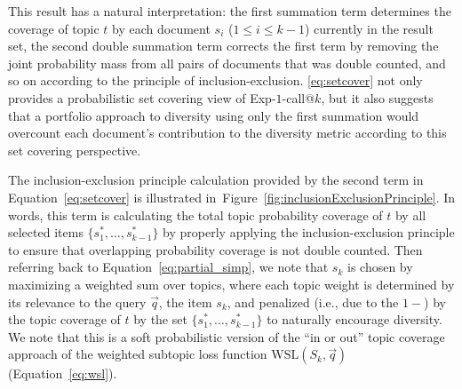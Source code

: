 This result has a natural interpretation: the first summation term
determines the coverage of topic $t$ by each document $s_i$ ($1 \leq i
\leq k-1$) currently in the result set, the second double summation
term corrects the first term by removing the joint probability mass
from all pairs of documents that was double counted, and so on
according to the principle of inclusion-exclusion.
\eqref{eq:setcover} not only provides a probabilistic set covering
view of Exp-$1$-call@$k$, but it also suggests that a portfolio
approach to diversity using only the first summation would overcount
each document's contribution to the diversity metric according to this
set covering perspective.

The inclusion-exclusion principle calculation provided by the second
term in Equation~\ref{eq:setcover} is illustrated in~Figure~\ref{fig:inclusionExclusionPrinciple}. In words, this term
is calculating the total topic probability coverage of $t$ by all
selected items $\{ s_1^*,\ldots,s_{k-1}^* \}$ by properly applying the
inclusion-exclusion principle to ensure that overlapping probability
coverage is not double counted. Then referring back to
Equation~\ref{eq:partial_simp}, we note that $s_k$ is chosen by
maximizing a weighted sum over topics, where each topic weight is
determined by its relevance to the query $\vec{q}$, the item $s_k$,
and penalized (i.e., due to the $1 - $) by the topic coverage of $t$
by the set $\{ s_1^*,\ldots,s_{k-1}^* \}$ to naturally encourage
diversity.  We note that this is a soft probabilistic version of the
``in or out'' topic coverage approach of the weighted subtopic loss function $\text{WSL}(S_k,
\vec{q})$ (Equation~\eqref{eq:wsl}).

